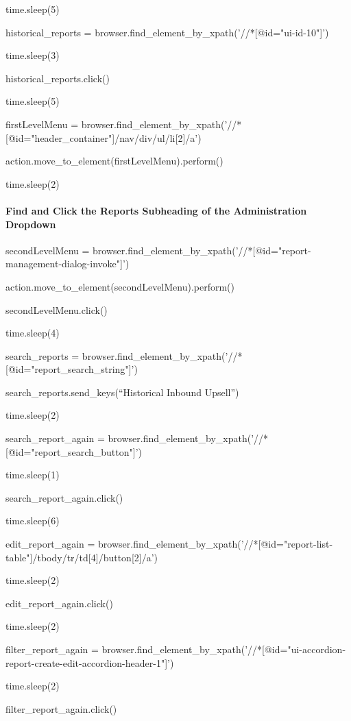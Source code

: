 \documentclass[]{article}
\let\oldparagraph\paragraph
\renewcommand{\paragraph}[1]{\oldparagraph{#1}\mbox{}}
\begin{document}
time.sleep(5)

historical\_reports =
browser.find\_element\_by\_xpath('//*{[}@id="ui-id-10"{]}')

time.sleep(3)

historical\_reports.click()

time.sleep(5)

firstLevelMenu =
browser.find\_element\_by\_xpath('//*{[}@id="header\_container"{]}/nav/div/ul/li{[}2{]}/a')

action.move\_to\_element(firstLevelMenu).perform()

time.sleep(2)

\paragraph{Find and Click the Reports Subheading of the Administration
Dropdown}\label{find-and-click-the-reports-subheading-of-the-administration-dropdown}

secondLevelMenu =
browser.find\_element\_by\_xpath('//*{[}@id="report-management-dialog-invoke"{]}')

action.move\_to\_element(secondLevelMenu).perform()

secondLevelMenu.click()

time.sleep(4)

search\_reports =
browser.find\_element\_by\_xpath('//*{[}@id="report\_search\_string"{]}')

search\_reports.send\_keys(``Historical Inbound Upsell'')

time.sleep(2)

search\_report\_again =
browser.find\_element\_by\_xpath('//*{[}@id="report\_search\_button"{]}')

time.sleep(1)

search\_report\_again.click()

time.sleep(6)

edit\_report\_again =
browser.find\_element\_by\_xpath('//*{[}@id="report-list-table"{]}/tbody/tr/td{[}4{]}/button{[}2{]}/a')

time.sleep(2)

edit\_report\_again.click()

time.sleep(2)

filter\_report\_again =
browser.find\_element\_by\_xpath('//*{[}@id="ui-accordion-report-create-edit-accordion-header-1"{]}')

time.sleep(2)

filter\_report\_again.click()
\end{document}

